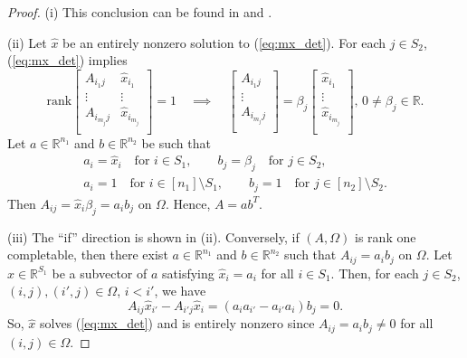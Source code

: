 \documentclass{amsart}
\newcommand{\re}{\mathbb{R}}
\def\rank{\mbox{rank}}
\newcommand{\reff}[1]{(\ref{#1})}
\newcommand{\bbm}{\begin{bmatrix}}
\newcommand{\ebm}{\end{bmatrix}}
\theoremstyle{definition}
\numberwithin{equation}{section}
\begin{document}
\begin{proof}
(i) This conclusion can be found in \cite[Lemma~1]{cosse2021} and \cite{kiraly12}.



\noindent (ii) Let $\hat{x}$ be an entirely nonzero solution to \reff{eq:mx_det}.
For each $j \in S_2$, \reff{eq:mx_det} implies
\[
\rank 
\bbm
A_{i_1 j} & \hat{x}_{i_1} \\
\vdots & \vdots \\
A_{i_{m_j} j} & \hat{x}_{i_{m_j}} \\
\ebm = 1
\quad \implies \quad 
\bbm
A_{i_1 j} \\
\vdots \\
A_{i_{m_j} j} \\
\ebm
= \beta_j \bbm
\hat{x}_{i_1} \\
\vdots \\
\hat{x}_{i_{m_j}} \\
\ebm, \,
0 \ne \beta_j \in \re.
\]
Let $a \in \re^{n_1}$ and $b \in \re^{n_2}$ be such that
\[
\begin{gathered}
a_i = \hat{x}_i \quad \text{for }  i \in S_1, \qquad
b_j = \beta_j \quad \text{for } j \in S_2, \\
a_i = 1 \quad \text{for } i \in [n_1] \setminus S_1, \qquad
b_j = 1 \quad \text{for } j \in [n_2] \setminus S_2.
\end{gathered}
\]
Then $A_{ij} = \hat{x}_i \beta_j = a_ib_j$ on $\Omega$.
Hence, $A = ab^T$.







\noindent (iii) The ``if'' direction is shown in (ii).
Conversely,
if $(A, \Omega)$ is rank one completable, 
then there exist $a \in \re^{n_1}$ and $b \in \re^{n_2}$ such that $A_{ij} = a_ib_j$ on $\Omega$.
Let $\hat{x} \in \re^{S_1}$ be a subvector of $a$ satisfying $\hat{x}_i = a_i$ for all $i \in S_1$.
Then, for each $j \in S_2$, $(i,j), (i', j) \in \Omega$, $i < i'$, we have
\[
A_{i j} \hat{x}_{i'} - A_{i' j} \hat{x}_{i} = ( a_ia_{i'} - a_{i'}a_i ) b_j = 0.
\]
So, $\hat{x}$ solves \reff{eq:mx_det} and is entirely nonzero since $A_{ij} = a_ib_j \ne 0$ for all $(i,j) \in \Omega$.








\end{proof}
\end{document}

